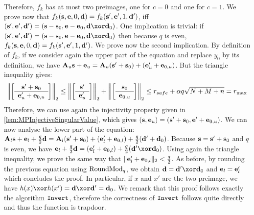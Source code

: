 {\begin{proofE}
    Therefore, $f_k$ has at most two preimages, one for $c =0$ and one for $c=1$. We prove now that $f_k(\mathbf{s},\mathbf{e},0,\mathbf{d}) = f_k(\mathbf{s}',\mathbf{e}',1,\mathbf{d}')$, iff $(\vect{s}', \vect{e}',\vect{d}') = (\vect{s}-\vect{s}_0,\vect{e}-\vect{e}_0,\vect{d} \xor \vect{d}_0)$. One implication is trivial: if $(\vect{s}', \vect{e}',\vect{d}') = (\vect{s}-\vect{s}_0,\vect{e}-\vect{e}_0,\vect{d} \xor \vect{d}_0)$ then because $q$ is even, $f_k(\mathbf{s},\mathbf{e},0,\mathbf{d}) = f_k(\mathbf{s}',\mathbf{e}',1,\mathbf{d}')$. We prove now the second implication. By definition of $f_k$, if we consider again the upper part of the equation and replace $y_0$ by its definition, we have $\mathbf{A}_u \mathbf{s}+\mathbf{e}_u = \mathbf{A}_u( \mathbf{s}'+\mathbf{s}_0) + (\mathbf{e}_u'+\mathbf{e}_{0,u})$. But the triangle inequality gives:
    \begin{align*}
      \left\|\SmallBlockMatrix{\vect{s}'+\vect{s}_0}{\vect{e}_u'+\vect{e}_{0,u}}\right\|_2 \leq \left\|\SmallBlockMatrix{\vect{s}'}{\vect{e}_u'}\right\|_2+\left\|\SmallBlockMatrix{\vect{s}_0}{\vect{e}_{0,u}}\right\|_2 \leq r_{safe} + \alpha q \sqrt{N+M+n} = r_{\max}
    \end{align*}
    Therefore, we can use again the injectivity property given in \cref{lem:MPInjectiveSingularValue}, which gives $(\mathbf{s},\mathbf{e}_u)=(\mathbf{s}'+\mathbf{s}_0,\mathbf{e}'+\mathbf{e}_{0,u})$. We can now analyse the lower part of the equation: $\mathbf{A}_l \mathbf{s}+\mathbf{e}_l + \frac{q}{2} \mathbf{d} = \mathbf{A}_l (\mathbf{s}'+\mathbf{s}_0)+(\mathbf{e}'_l+\mathbf{e}_{0,l}) + \frac{q}{2} (\mathbf{d}' + \mathbf{d}_0)$. Because $\mathbf{s}=\mathbf{s}'+\mathbf{s}_0$ and $q$ is even, we have $\vect{e}_l + \frac{q}{2} \vect{d} = (\vect{e}'_l+\vect{e}_{0,l}) + \frac{q}{2} (\vect{d}'\xor \vect{d}_0)$. Using again the triangle inequality, we prove the same way that $\|\mathbf{e}'_l+\mathbf{e}_{0,l}\|_2 < \frac{q}{2}$. As before, by rounding the previous equation using $\operatorname{RoundMod}_q$, we obtain $\vect{d}=\vect{d}'\xor \vect{d}_0$ and $\mathbf{e}_l = \mathbf{e}'_l$ which concludes the proof. In particular, if $x$ and $x'$ are the two preimage, we have $h(x) \xor h(x')= \vect{d}\xor \vect{d}' = \vect{d}_0$. We remark that this proof follows exactly the algorithm ${\tt Invert}$, therefore the correctness of ${\tt Invert}$ follows quite directly and thus the function is trapdoor.


\end{proofE}}
